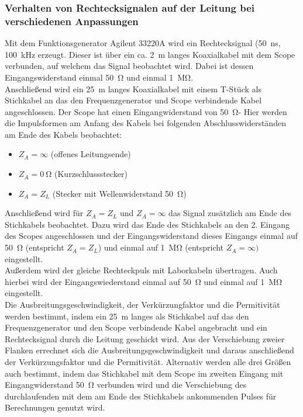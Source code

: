 \documentclass[a4paper,twoside,final]{article}
\begin{document}
\subsubsection{Verhalten von Rechtecksignalen auf der Leitung bei verschiedenen Anpassungen}
Mit dem Funktionsgenerator Agilent 33220A wird ein Rechtecksignal (\SI{50}{\nano\second}, \SI{100}{\kilo\hertz} erzeugt. Dieser ist über ein ca. \SI{2}{\meter} langes Koaxialkabel mit dem Scope verbunden, auf welchem das Signal beobachtet wird. Dabei ist dessen Eingangswiderstand einmal  \SI{50}{\ohm} und einmal \SI{1}{\mega\ohm}.
 \\
Anschließend wird ein \SI{25}{\meter} langes Koaxialkabel mit einem T-Stück als Stichkabel an das den Frequenzgenerator und Scope verbindende Kabel angeschlossen. Der Scope hat einen Eingangwiderstand von \SI{50}{\ohm}- Hier werden die Impulsformen am Anfang des Kabels bei folgenden Abschlusswiderständen am Ende des Kabels beobachtet:
\begin{itemize}
  \item $Z_A = \infty$ (offenes Leitungsende)
  \item $Z_A = \SI{0}{\ohm}$ (Kurzschlussstecker)
  \item $Z_A = Z_L$ (Stecker mit Wellenwiderstand \SI{50}{\ohm})

\end{itemize}

Anschließend wird für $Z_A=Z_L$ und $Z_A = \infty$ das Signal zusätzlich am Ende des Stichkabels beobachtet. Dazu wird das Ende des Stichkabels an den 2. Eingang des Scopes angeschlossen und der Eingangswiderstand dieses Eingangs einmal auf \SI{50}{\ohm} (entspricht $Z_A = Z_L$) und einmal auf \SI{1}{\mega\ohm} (entspricht $Z_A = \infty)$ eingestellt. \\

Außerdem wird der gleiche Rechteckpuls mit Laborkabeln übertragen. Auch hierbei wird der Eingangswiederstand einmal auf \SI{50}{\ohm} und einmal auf \SI{1}{\mega\ohm} eingestellt. \\

Die Ausbreitungsgeschwindigkeit, der Verkürzungfaktor und die Permitivität werden bestimmt, indem ein \SI{25}{\meter} langes als Stichkabel auf das den Frequenzgenerator und den Scope verbindende Kabel angebracht und ein Rechtecksignal durch die Leitung geschickt wird. Aus der Verschiebung zweier Flanken errechnet sich die Ausbreitungsgeschwindigkeit und daraus anschließend der Verkürzungsfaktor und die Permitivität. Alternativ werden alle drei Größen auch bestimmt, indem das Stichkabel mit dem Scope im zweiten Eingang mit Eingangwiderstand \SI{50}{\ohm} verbunden wird und die Verschiebung des durchlaufenden mit dem am Ende des Stichkabels ankommenden Pulses für Berechnungen genutzt wird.
\end{document}
